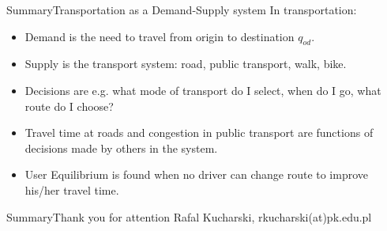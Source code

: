 \documentclass{beamer}
\begin{document}
\begin{frame}{Summary}{Transportation as a Demand-Supply system}
In transportation:
\begin{itemize}
\item Demand is the need to travel from origin to destination $q_{od}$. 
\item Supply is the transport system: road, public transport, walk, bike.
\item Decisions are e.g. what mode of transport do I select, when do I go, what route do I choose?
\item Travel time at roads and congestion in public transport are functions of decisions made by others in the system.
\item User Equilibrium is found when no driver can change route to improve his/her travel time.
\end{itemize}
\end{frame}

\begin{frame}{Summary}{Thank you for attention}
Rafal Kucharski, rkucharski(at)pk.edu.pl
\end{frame}
\end{document}
